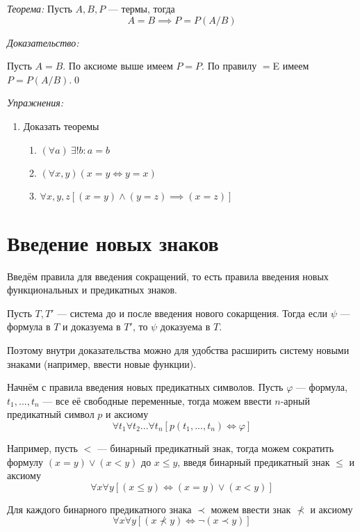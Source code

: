 {\it Теорема:} Пусть $A,B,P$ --- термы, тогда
\[
	A=B\implies P=P(A/B)
\]

{\it Доказательство:}

Пусть $A=B$. По аксиоме выше имеем $P=P$. По правилу $=$E имеем $P=P(A/B)$.\qed


\vspace{1em}
{\it Упражнения:}
\begin{enumerate}
	\item{}Доказать теоремы
	\begin{enumerate}
		\item{}$(\forall a)~\exists! b:a=b$
		\item{}$(\forall x,y)(x=y\iff y=x)$
		\item{}$\forall x,y,z[(x=y)\land (y=z)\implies (x=z)]$
	\end{enumerate}
\end{enumerate}

\section{Введение новых знаков}

Введём правила для введения сокращений, то есть правила введения новых функциональных
и предикатных знаков.

Пусть $T,T'$ --- система до и после введения нового сокарщения. Тогда
если $\psi$ --- формула в $T$ и доказуема в $T'$, то $\psi$ доказуема в $T$.

Поэтому внутри доказательства можно для удобства расширить систему
новыми знаками (например, ввести новые функции).

Начнём с правила введения новых предикатных символов. Пусть $\varphi$ --- формула,
$t_1,...,t_{n}$ --- все её свободные переменные, тогда можем ввести
$n$-арный предикатный символ $p$ и аксиому
\[
	\forall t_1\forall t_2...\forall t_{n}[p(t_1,...,t_{n})\iff\varphi]
\]

Например, пусть $<$ --- бинарный предикатный знак, тогда можем сократить формулу
$(x=y)\lor (x<y)$ до $x\leq y$, введя бинарный предикатный знак $\leq$ и аксиому
\[
	\forall x\forall y[(x\leq y)\iff (x=y)\lor (x<y)]
\]

Для каждого бинарного предикатного знака $\prec$ можем ввести знак $\nprec$ и аксиому
\[
	\forall x\forall y[(x\nprec y)\iff \lnot(x\prec y)]
\]

